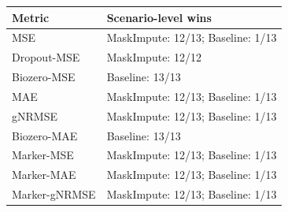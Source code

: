 \begin{tabular}{@{}ll@{}}
\toprule
Metric & Scenario-level wins \\
\midrule
MSE & MaskImpute: 12/13; Baseline: 1/13 \\
Dropout-MSE & MaskImpute: 12/12 \\
Biozero-MSE & Baseline: 13/13 \\
MAE & MaskImpute: 12/13; Baseline: 1/13 \\
gNRMSE & MaskImpute: 12/13; Baseline: 1/13 \\
Biozero-MAE & Baseline: 13/13 \\
Marker-MSE & MaskImpute: 12/13; Baseline: 1/13 \\
Marker-MAE & MaskImpute: 12/13; Baseline: 1/13 \\
Marker-gNRMSE & MaskImpute: 12/13; Baseline: 1/13 \\
\bottomrule
\end{tabular}
